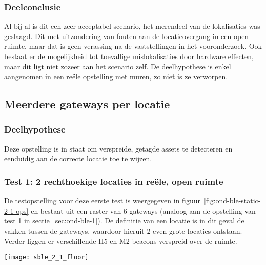 \subsubsection{Deelconclusie}
Al bij al is dit een zeer acceptabel scenario, het merendeel van de lokalisaties was geslaagd. Dit met uitzondering van fouten aan de locatieovergang in een open ruimte, maar dat is geen verassing na de vaststellingen in het vooronderzoek. Ook bestaat er de mogelijkheid tot toevallige mislokalisaties door hardware effecten, maar dit ligt niet zozeer aan het scenario zelf. De deelhypothese is enkel aangenomen in een reële opstelling met muren, zo niet is ze verworpen.

\subsection{Meerdere gateways per locatie}
\label{sec:ond-ble-2}

\subsubsection{Deelhypothese}
Deze opstelling is in staat om verspreide, getagde assets te detecteren en eenduidig aan de correcte locatie toe te wijzen.

\subsubsection{Test 1: 2 rechthoekige locaties in reële, open ruimte}
\label{sec:ond-ble-2-1}
\begin{minipage}{0.55\textwidth}
De testopstelling voor deze eerste test is weergegeven in figuur~\ref{fig:ond-ble-static-2-1-ops} en bestaat uit een raster van 6 gateways (analoog aan de opstelling van test 1 in sectie~\ref{sec:ond-ble-1}). De definitie van een locatie is in dit geval de vakken tussen de gateways, waardoor hieruit 2 even grote locaties ontstaan. Verder liggen er verschillende H5 en M2 beacons verspreid over de ruimte.
\end{minipage}
\hfill
\begin{minipage}{0.42\textwidth}
	\texttt{[image: sble\_2\_1\_floor]}
	\label{fig:ond-ble-static-2-1-ops}
\end{minipage}

